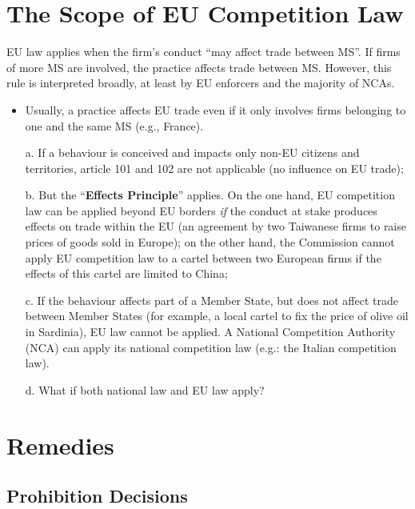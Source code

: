 \newpage
\section{The Scope of EU Competition Law}

    EU law applies when the firm’s conduct “may affect trade between MS”.  
    If firms of more MS are involved, the practice affects trade between MS.  
    However, this rule is interpreted broadly, at least by EU enforcers and the majority of NCAs.
    \begin{itemize}
        \item Usually, a practice affects EU trade even if it only involves firms belonging to one and the same MS (e.g., France).
    \end{itemize}
    
    \begin{itemize}
        \item[a.] If a behaviour is conceived and impacts only non-EU citizens and territories, article 101 and 102 are not applicable (no influence on EU trade);
        \item[b.] But the “\textbf{Effects Principle}” applies. On the one hand, EU competition law can be applied beyond EU borders \textit{if} the conduct at stake produces effects on trade within the EU (an agreement by two Taiwanese firms to raise prices of goods sold in Europe); on the other hand, the Commission cannot apply EU competition law to a cartel between two European firms if the effects of this cartel are limited to China;
        \item[c.]  If the behaviour affects part of a Member State, but does not affect trade between Member States (for example, a local cartel to fix the price of olive oil in Sardinia), EU law cannot be applied. A National Competition Authority (NCA) can apply its national competition law (e.g.: the Italian competition law).
        \item[d.] What if both national law and EU law apply?
    \end{itemize}

\section{Remedies}

    \subsection{Prohibition Decisions}

